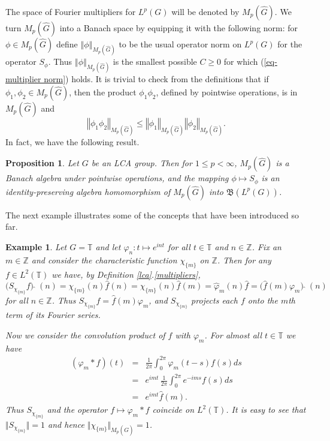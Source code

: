 \documentclass[12pt]{UNSWthesis}
\newcommand{\T}{\mathbb{T}}
\newcommand{\Z}{\mathbb{Z}}
\newcommand{\B}{\mathfrak{B}}
\newcommand{\hatt}[1]{\widehat #1}
\newcommand{\reff}[2]{\ref{#1}.\ref{#2}}
\def\norm#1{\left \Vert #1 \right \Vert}
\def\ssnorm#1{\Vert #1 \Vert}
\newtheorem{proposition}[theorem]{Proposition}
\newtheorem{example}[theorem]{Example}
\numberwithin{equation}{section}
\begin{document}
The space of Fourier multipliers for $L^p(G)$ will be denoted by
$M_p(\hatt{G})$. We turn $M_p(\hatt{G})$ into a Banach space by equipping it 
with
the following norm: for $\phi\in M_p(\hatt{G})$ define
$\norm{\phi}_{M_p(\hatt{G})}$ to be the usual operator norm on $L^p(G)$ for the
operator $S_{\phi}$. Thus $\norm{\phi}_{M_p(\hatt{G})}$ is the smallest
possible $C\geq 0$ for which (\ref{eq-multiplier norm}) holds. It is
trivial to check from the definitions that if $\phi_1,\phi_2\in M_p(\hatt{G})$,
then the product $\phi_1\phi_2$, defined by pointwise operations, is in
$M_p(\hatt{G})$ and
\[\norm{\phi_1\phi_2}_{M_p(\hatt{G})}\leq\norm{\phi_1}_{M_p(\hatt{G})}
\norm{\phi_2}_{M_p(\hatt{G})}.\]
In fact, we have the following result.

\begin{proposition}\label{multiplier algebra}\cite[\S3]{BG Spectral}
Let $G$ be an LCA group. Then for $1\leq p<\infty$,
$M_p(\hatt{G})$ is a Banach algebra under pointwise operations, and the mapping
$\phi\mapsto S_{\phi}$ is an identity-preserving algebra homomorphism of
$M_p(\hatt{G})$ into $\B(L^p(G))$.
\end{proposition}

The next example illustrates some of the concepts that
have been introduced so far.

\begin{example}\label{lca example}
Let $G=\T$ and let $\varphi_n:t\mapsto e^{int}$ for all $t\in\T$ and $n\in\Z$.
Fix an $m\in\Z$ 
and consider the characteristic function $\chi_{\{m\}}$ on $\Z$.
Then for any $f\in L^2(\T)$ we have, by Definition \reff{lca}{multipliers},
\[\bigl(S_{\chi_{\{m\}}}f\bigr)\,\hatt{\,}\,(n)=\chi_{\{m\}}(n)\hatt{f}(n)
=\chi_{\{m\}}(n)\hatt{f}(m)=\hatt{\varphi}_m(n)\hatt{f}=
\bigl(\hatt{f}(m)\varphi_m\bigr)\,\hatt{\,}\,(n)\]
for all $n\in\Z$. Thus $S_{\chi_{\{m\}}}f=\hatt{f}(m)\varphi_m$, and
$S_{\chi_{\{m\}}}$ projects each $f$ onto the $m$th term of its Fourier
series.

Now we consider the convolution product of $f$ with $\varphi_m$.
For almost all $t\in\T$ we have
\begin{eqnarray*}
(\varphi_m*f)(t) &=& \frac{1}{2\pi}\int_0^{2\pi}\varphi_m(t-s)f(s)ds \\
& = & e^{imt}\,\frac{1}{2\pi}\int_0^{2\pi}e^{-ims}f(s)ds \\
& = & e^{imt}\hatt{f}(m).
\end{eqnarray*}
Thus $S_{\chi_{\{m\}}}$ and the operator $f\mapsto\varphi_m*f$ coincide on
$L^2(\T)$. It is easy to see that $\ssnorm{S_{\chi_{\{m\}}}}=1$ and hence
$\ssnorm{\chi_{\{m\}}}_{M_p(\hatt{G})}=1$.
\end{example}
\end{document}
